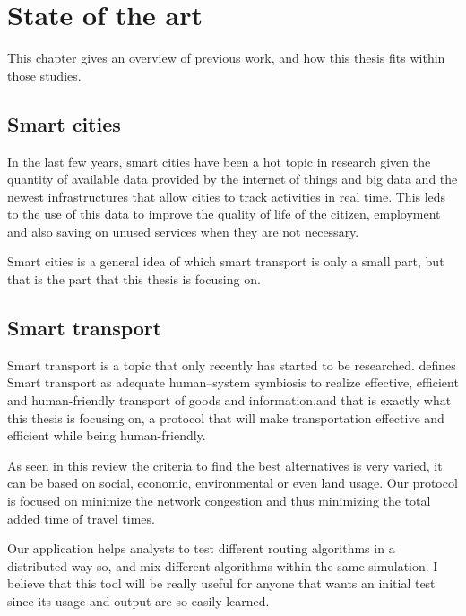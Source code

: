 \chapter{State of the art}

This chapter gives an overview of previous work, and how this thesis fits within those studies.

\section{Smart cities}

In the last few years, smart cities have been a hot topic in research \cite{caragliu_bo_nijkamp_2011} given the quantity of available data provided by the internet of things \cite{zanella_bui_castellani_vangelista_zorzi_2014} and big data \cite{townsend_2013} and the newest infrastructures that allow cities to track activities in real time. This leds to the use of this data to improve the quality of life of the citizen, employment\cite{shapiro_2005} and also saving on unused services when they are not necessary.

Smart cities is a general idea of which smart transport is only a small part, but that is the part that this thesis is focusing on.

\section{Smart transport}

Smart transport is a topic that only recently has started to be researched. \cite{lenior_janssen_neerincx_schreibers_2006} defines Smart transport as \glqq adequate human–system symbiosis to realize effective, efficient and human-friendly transport of goods and information.\grqq and that is exactly what this thesis is focusing on, a protocol that will make transportation effective and efficient while being human-friendly.

As seen in this review \cite{perez_carrillo_montoya-torres_2014} the criteria to find the best alternatives is very varied, it can be based on  social, economic, environmental or even land usage. Our protocol is focused on minimize the network congestion and thus minimizing the total added time of travel times.

Our application helps analysts to test different routing algorithms in a distributed way so, and mix different algorithms within the same simulation. I believe that this tool will be really useful for anyone that wants an initial test since its usage and output are so easily learned.





